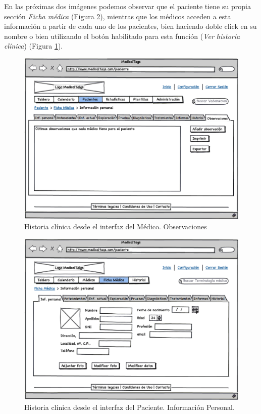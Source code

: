 		En las próximas dos imágenes podemos observar que el paciente tiene su propia sección \textit{Ficha médica} (Figura \ref{fig:hc_paciente}), mientras que los médicos acceden a esta información a partir de cada uno de los pacientes, bien haciendo doble click en su nombre o bien utilizando el botón habilitado para esta función (\textit{Ver historia clínica}) (Figura \ref{fig:hc_medico}).
		
		\begin{figure}[H]
		  \centering
		    \includegraphics[width=12cm]{img/eps/29_1_Historial_Medico.eps}
		  \caption{Historia clínica desde el interfaz del Médico. Observaciones}
		  \label{fig:hc_medico}
		\end{figure}
		
		\begin{figure}[H]
		  \centering
		    \includegraphics[width=12cm]{img/eps/29_Historial_Paciente.eps}
		  \caption{Historia clínica desde el interfaz del Paciente. Información Personal.}
		  \label{fig:hc_paciente}
		\end{figure}
		
